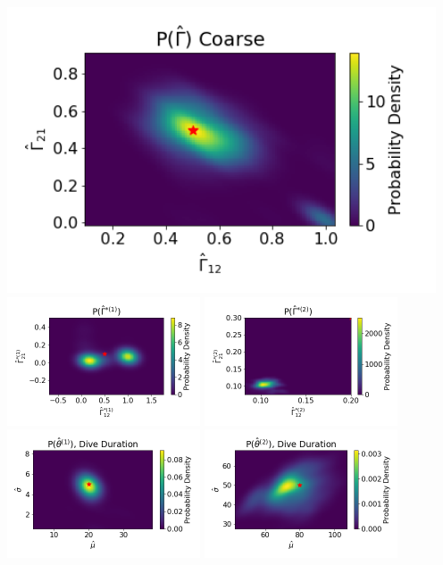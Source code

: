 \documentclass[12pt]{TD-CJS}
\begin{document}
\centering
\includegraphics[width=5in]{../Plots/hhmm_V_Gamma_density_-1.png}
\includegraphics[width=2.25in]{../Plots/hhmm_V_Gamma_density_0.png}
\includegraphics[width=2.25in]{../Plots/hhmm_V_Gamma_density_1.png}
\includegraphics[width=2.25in]{../Plots/hhmm_V_MLE_density_dive_duration_-1_0.png}
\includegraphics[width=2.25in]{../Plots/hhmm_V_MLE_density_dive_duration_-1_1.png}
\end{document}
